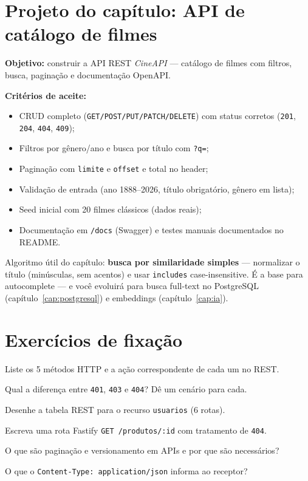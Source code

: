 \section{Projeto do capítulo: API de catálogo de filmes}
\label{sec:projeto11}

\begin{caixaprojeto}
\textbf{Objetivo:} construir a API REST \emph{CineAPI} — catálogo de filmes com
filtros, busca, paginação e documentação OpenAPI.

\textbf{Critérios de aceite:}
\begin{itemize}[leftmargin=*, itemsep=0.2em]
  \item CRUD completo (\texttt{GET/POST/PUT/PATCH/DELETE}) com status corretos (\texttt{201}, \texttt{204}, \texttt{404}, \texttt{409});
  \item Filtros por gênero/ano e busca por título com \texttt{?q=};
  \item Paginação com \texttt{limite} e \texttt{offset} e total no header;
  \item Validação de entrada (ano 1888--2026, título obrigatório, gênero em lista);
  \item Seed inicial com 20 filmes clássicos (dados reais);
  \item Documentação em \texttt{/docs} (Swagger) e testes manuais documentados no README.
\end{itemize}
\end{caixaprojeto}

\begin{caixadica}
Algoritmo útil do capítulo: \textbf{busca por similaridade simples} —
normalizar o título (minúsculas, sem acentos) e usar \texttt{includes}
case-insensitive. É a base para autocomplete — e você evoluirá para busca
full-text no PostgreSQL (capítulo~\ref{cap:postgresql}) e embeddings
(capítulo~\ref{cap:ia}).
\end{caixadica}

\section{Exercícios de fixação}

\begin{exercicios}
  \item Liste os 5 métodos HTTP e a ação correspondente de cada um no REST.
  \item Qual a diferença entre \texttt{401}, \texttt{403} e \texttt{404}? Dê um cenário para cada.
  \item Desenhe a tabela REST para o recurso \texttt{usuarios} (6 rotas).
  \item Escreva uma rota Fastify \texttt{GET /produtos/:id} com tratamento de \texttt{404}.
  \item O que são paginação e versionamento em APIs e por que são necessários?
  \item O que o \texttt{Content-Type: application/json} informa ao receptor?
\end{exercicios}

